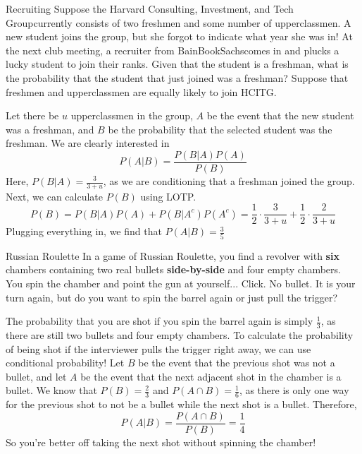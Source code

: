 \documentclass[11pt]{article}
\begin{document}
\begin{exercise}{Recruiting}
Suppose the Harvard Consulting, Investment, and Tech Group\texttrademark  currently consists of two freshmen and some number of upperclassmen. A new student joins the group, but she forgot to indicate what year she was in! At the next club meeting, a recruiter from BainBookSachs\texttrademark  comes in and plucks a lucky student to join their ranks. Given that the student is a freshman, what is the probability that the student that just joined was a freshman? Suppose that freshmen and upperclassmen are equally likely to join HCITG. 

\begin{solution}{2}
Let there be $u$ upperclassmen in the group, $A$ be the event that the new student was a freshman, and $B$ be the probability that the selected student was the freshman. We are clearly interested in 
 \[P(A|B) = \frac{P(B|A)P(A)}{P(B)}\]
Here, $P(B|A) = \frac{3}{3+u}$, as we are conditioning that a freshman joined the group. Next, we can calculate $P(B)$ using LOTP. 
    \[P(B) = P(B|A)P(A) + P\left(B|A^c\right)P\left(A^c\right) = \frac{1}{2}\cdot\frac{3}{3+u} + \frac{1}{2}\cdot  \frac{2}{3+u}\]
Plugging everything in, we find that $P(A|B) = \frac{3}{5}$
\end{solution}
\end{exercise}


\begin{exercise}{Russian Roulette}
In a game of Russian Roulette, you find a revolver with \textbf{six} chambers containing two real bullets \textbf{side-by-side} and four empty chambers. You spin the chamber and point the gun at yourself... Click. No bullet.  It is your turn again, but do you want to spin the barrel again or just pull the trigger?  

\begin{solution}{2}
The probability that you are shot if you spin the barrel again is simply $\frac{1}{3}$, as there are still two bullets and four empty chambers. To calculate the probability of being shot if the interviewer pulls the trigger right away, we can use conditional probability! Let $B$ be the event that the previous shot was not a bullet, and let $A$ be the event that the next adjacent shot in the chamber is a bullet. We know that $P(B) = \frac{2}{3}$ and $P(A \cap B) = \frac{1}{6}$, as there is only one way for the previous shot to not be a bullet while the next shot is a bullet. Therefore, 
    $$P(A|B) = \frac{P(A \cap B)}{P(B)} = \frac{1}{4}$$
So you're better off taking the next shot without spinning the chamber!     
\end{solution}

\end{exercise}
\end{document}
